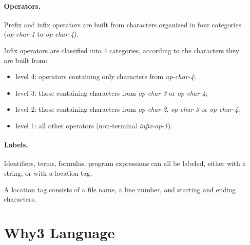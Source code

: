 \paragraph{Operators.}
Prefix and infix operators are built from characters organized in four
categories (\textsl{op-char-1} to \textsl{op-char-4}).
\begin{center}\framebox{}\end{center}
Infix operators are classified into 4 categories, according to the
characters they are built from:
\begin{itemize}
\item level 4: operators containing only characters from
\textit{op-char-4};
\item level 3: those containing
 characters from \textit{op-char-3} or \textit{op-char-4};
\item level 2: those containing
 characters from \textit{op-char-2}, \textit{op-char-3} or
 \textit{op-char-4};
\item level 1: all other operators (non-terminal \textit{infix-op-1}).
\end{itemize}

\paragraph{Labels.} Identifiers, terms, formulas, program expressions
can all be labeled, either with a string, or with a location tag.
\begin{center}\framebox{}\end{center}
A location tag consists of a file name, a line number, and starting
and ending characters.


\section{Why3 Language}

